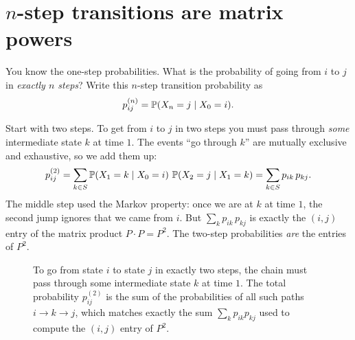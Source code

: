 \section{$n$-step transitions are matrix powers}
\label{ch23:matrix-powers}

You know the one-step probabilities.
What is the probability of going from $i$ to $j$ in \emph{exactly $n$ steps}? Write this
$n$-step transition probability as
\[
  p_{ij}^{(n)} = \operatorname{\mathbb{P}}(X_n = j \mid X_0 = i).
\]

Start with two steps. To get from $i$ to $j$ in two steps you must pass through \emph{some}
intermediate state $k$ at time $1$. The events ``go through $k$'' are mutually exclusive and
exhaustive, so we add them up:
\[
  p_{ij}^{(2)} = \sum_{k \in S} \operatorname{\mathbb{P}}(X_1 = k \mid X_0 = i)\,\operatorname{\mathbb{P}}(X_2 = j \mid X_1 = k)
              = \sum_{k \in S} p_{ik}\, p_{kj}.
\]
The middle step used the Markov property: once we are at $k$ at time $1$, the second jump
ignores that we came from $i$. But $\sum_k p_{ik}\,p_{kj}$ is exactly the $(i,j)$ entry of
the matrix product $P \cdot P = P^2$. The two-step probabilities \emph{are} the entries of
$P^2$.

\begin{figure}[H]
\centering
{}
\caption{To go from state $i$ to state $j$ in exactly two steps, the chain must pass through some intermediate state $k$ at time $1$. The total probability $p_{ij}^{(2)}$ is the sum of the probabilities of all such paths $i \to k \to j$, which matches exactly the sum $\sum_k p_{ik} p_{kj}$ used to compute the $(i,j)$ entry of $P^2$.}
\label{ch23:fig-chapman-kolmogorov}
\end{figure}

